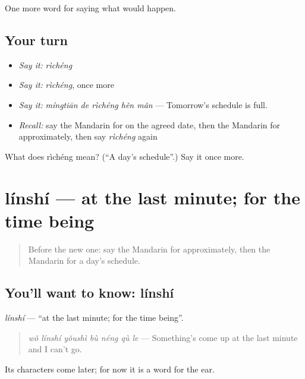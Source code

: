 \begin{grammarlens}[title={What you've built}]
One more word for saying what would happen.
\end{grammarlens}

\subsection*{Your turn}
\begin{itemize}
\raggedright
  \item \emph{Say it:} \emph{rìchéng}
  \item \emph{Say it:} \emph{rìchéng}, once more
  \item \emph{Say it:} \emph{míngtiān de rìchéng hěn mǎn} — Tomorrow's schedule is full.
  \item \emph{Recall:} say the Mandarin for on the agreed date, then the Mandarin for approximately, then say \emph{rìchéng} again
\end{itemize}

\begin{tcolorbox}[breakable,colback=teal!4,colframe=teal!35!black,title={Before you move on}]
What does rìchéng mean? (\textquotedblleft{}A day's schedule\textquotedblright{}.) Say it once more.
\end{tcolorbox}
\section[línshí]{línshí — at the last minute; for the time being}

\label{lesson:ZH-C391-linshi}



\begin{quote}
Before the new one: say the Mandarin for approximately, then the Mandarin for a day's schedule.
\end{quote}

\subsection*{You'll want to know: línshí}
\emph{línshí} — \textquotedblleft{}at the last minute; for the time being\textquotedblright{}.

\begin{quote}
\emph{wǒ línshí yǒushì bù néng qù le} — Something's come up at the last minute and I can't go.
\end{quote}

Its characters come later; for now it is a word for the ear.

